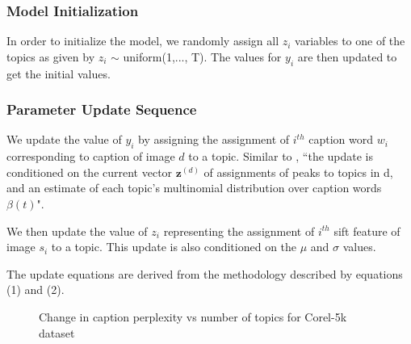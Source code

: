 \documentclass[journal]{IEEEtran}
\begin{document}
\subsubsection{Model Initialization}
In order to initialize the model, we randomly assign all $z_i$ variables to one of the topics as given by $z_i$ $\sim$ uniform(1,..., T). The values for $y_i$ are then updated to get the initial values. 

\subsubsection{Parameter Update Sequence}
We update the value of $y_i$ by assigning the assignment of $i^{th}$ caption word $w_i$ corresponding to caption of image $d$ to a topic. Similar to \cite{gclda}, ``the update is conditioned on the current vector $\mathbf{z}^{(d)}$ of assignments of peaks to topics in d, and an estimate of each topic’s multinomial distribution over caption words $\beta(t)$".

We then update the value of $z_i$ representing the assignment of $i^{th}$ sift feature of image $s_i$ to a topic. This update is also conditioned on the $\mu$ and $\sigma$ values.

The update equations are derived from the methodology described by equations (1) and (2).


\begin{figure}[t]
\centering
{}%
\qquad
{}%
\caption{Change in caption perplexity vs number of topics for Corel-5k dataset}
\end{figure}
\end{document}
